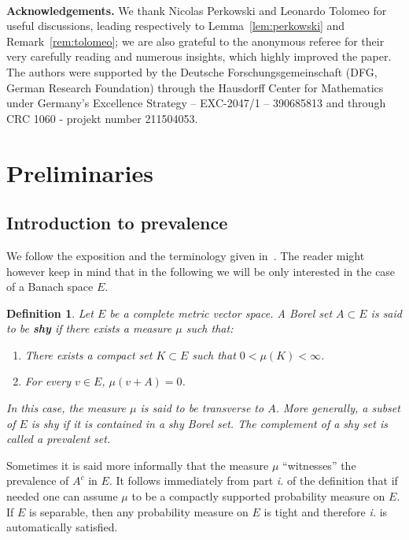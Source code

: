 \documentclass[10pt]{article}
\newcommand{\tmtextbf}[1]{{\bfseries{#1}}}
\newcommand{\tmtextit}[1]{{\itshape{#1}}}
\newtheorem{definition}[theorem]{Definition}
\begin{document}
\

\tmtextbf{Acknowledgements.} We thank Nicolas Perkowski and Leonardo Tolomeo
for useful discussions, leading respectively to Lemma~\ref{lem:perkowski} and
Remark~\ref{rem:tolomeo}; we are also grateful to the anonymous referee for
their very carefully reading and numerous insights, which highly improved the
paper. The authors were supported by the Deutsche Forschungsgemeinschaft (DFG,
German Research Foundation) through the Hausdorff Center for Mathematics under
Germany's Excellence Strategy -- EXC-2047/1 -- 390685813 and through CRC 1060
- projekt number 211504053.

\section{Preliminaries}\label{sec2}

\subsection{Introduction to prevalence}\label{sec2.1}

We follow the exposition and the terminology given in~{\cite{huntsauer}}. The
reader might however keep in mind that in the following we will be only
interested in the case of a Banach space $E$.

\begin{definition}
  \label{definition prevalence}Let $E$ be a complete metric vector space. A
  Borel set $A \subset E$ is said to be \tmtextbf{shy} if there exists a
  measure $\mu$ such that:
  \begin{enumerate}[label=\roman*.]
    \item There exists a compact set $K \subset E$ such that $0 < \mu (K) <
    \infty$.
    \item For every $v \in E$, $\mu (v + A) = 0$.
  \end{enumerate}
  In this case, the measure $\mu$ is said to be transverse to $A$. More
  generally, a subset of $E$ is shy if it is contained in a shy Borel set. The
  complement of a shy set is called a prevalent set.
\end{definition}

Sometimes it is said more informally that the measure $\mu$ ``witnesses'' the
prevalence of $A^c$ in $E$. It follows immediately from part \tmtextit{i.} of
the definition that if needed one can assume $\mu$ to be a compactly supported
probability measure on $E$. If $E$ is separable, then any probability measure
on $E$ is tight and therefore \tmtextit{i.} is automatically satisfied.
\end{document}
